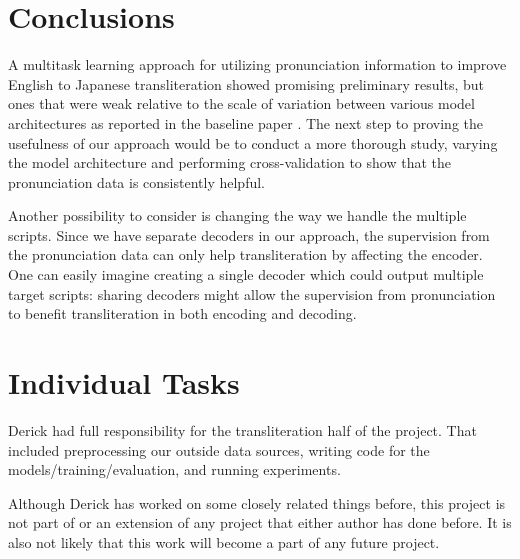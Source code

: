 \documentclass{article}
\begin{document}
\section*{Conclusions}

A multitask learning approach for utilizing pronunciation information
to improve English to Japanese transliteration
showed promising preliminary results,
but ones that were weak relative to the scale of variation
between various model architectures as reported
in the baseline paper \cite{Rosca2016SequencetosequenceNN}.
The next step to proving the usefulness of our approach
would be to conduct a more thorough study,
varying the model architecture and performing cross-validation
to show that the pronunciation data is consistently helpful.

Another possibility to consider
is changing the way we handle the multiple scripts.
Since we have separate decoders in our approach,
the supervision from the pronunciation data
can only help transliteration by affecting the encoder.
One can easily imagine creating a single decoder
which could output multiple target scripts:
sharing decoders might allow the supervision from pronunciation
to benefit transliteration in both encoding and decoding.

\section*{Individual Tasks}

Derick had full responsibility for the transliteration half of the project.
That included preprocessing our outside data sources,
writing code for the models/training/evaluation,
and running experiments.

Although Derick has worked on some closely related things before,
this project is not part of or an extension of any project
that either author has done before.
It is also not likely that this work will become a part of any future project.


{}

\end{document}
